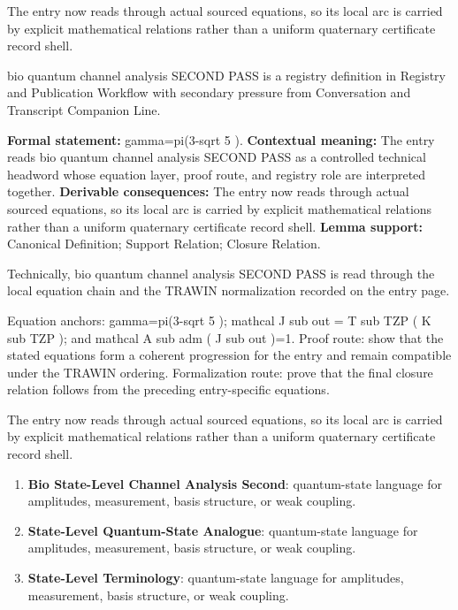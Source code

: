 The entry now reads through actual sourced equations, so its local arc is carried by explicit mathematical relations rather than a uniform quaternary certificate record shell.
\clearpage


\begingroup\small
{}
bio quantum channel analysis SECOND PASS is a registry definition in Registry and Publication Workflow with secondary pressure from Conversation and Transcript Companion Line.

\begingroup\footnotesize\setlength{\emergencystretch}{3em}\sloppy
\textbf{Formal statement:} gamma=pi(3-sqrt 5 ). \textbf{Contextual meaning:} The entry reads bio quantum channel analysis SECOND PASS as a controlled technical headword whose equation layer, proof route, and registry role are interpreted together. \textbf{Derivable consequences:} The entry now reads through actual sourced equations, so its local arc is carried by explicit mathematical relations rather than a uniform quaternary certificate record shell. \textbf{Lemma support:} Canonical Definition; Support Relation; Closure Relation.\par
\endgroup

Technically, bio quantum channel analysis SECOND PASS is read through the local equation chain and the TRAWIN normalization recorded on the entry page.

Equation anchors: gamma=pi(3-sqrt 5 ); mathcal J sub out = T sub TZP ( K sub TZP ); and mathcal A sub adm ( J sub out )=1. Proof route: show that the stated equations form a coherent progression for the entry and remain compatible under the TRAWIN ordering. Formalization route: prove that the final closure relation follows from the preceding entry-specific equations.

The entry now reads through actual sourced equations, so its local arc is carried by explicit mathematical relations rather than a uniform quaternary certificate record shell.
\endgroup

\begin{enumerate}[leftmargin=1.6em,itemsep=6pt,topsep=4pt]
\item \textbf{Bio State-Level Channel Analysis Second}: quantum-state language for amplitudes, measurement, basis structure, or weak coupling.
\item \textbf{State-Level Quantum-State Analogue}: quantum-state language for amplitudes, measurement, basis structure, or weak coupling.
\item \textbf{State-Level Terminology}: quantum-state language for amplitudes, measurement, basis structure, or weak coupling.
\end{enumerate}

